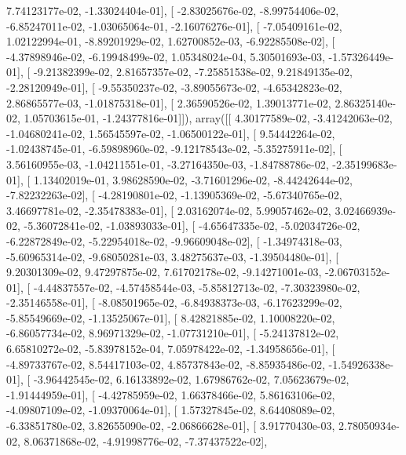 \documentclass{article}
\begin{document}
          7.74123177e-02,  -1.33024404e-01],
       [ -2.83025676e-02,  -8.99754406e-02,  -6.85247011e-02,
         -1.03065064e-01,  -2.16076276e-01],
       [ -7.05409161e-02,   1.02122994e-01,  -8.89201929e-02,
          1.62700852e-03,  -6.92285508e-02],
       [ -4.37898946e-02,  -6.19948499e-02,   1.05348024e-04,
          5.30501693e-03,  -1.57326449e-01],
       [ -9.21382399e-02,   2.81657357e-02,  -7.25851538e-02,
          9.21849135e-02,  -2.28120949e-01],
       [ -9.55350237e-02,  -3.89055673e-02,  -4.65342823e-02,
          2.86865577e-03,  -1.01875318e-01],
       [  2.36590526e-02,   1.39013771e-02,   2.86325140e-02,
          1.05703615e-01,  -1.24377816e-01]]), array([[  4.30177589e-02,  -3.41242063e-02,  -1.04680241e-02,
          1.56545597e-02,  -1.06500122e-01],
       [  9.54442264e-02,  -1.02438745e-01,  -6.59898960e-02,
         -9.12178543e-02,  -5.35275911e-02],
       [  3.56160955e-03,  -1.04211551e-01,  -3.27164350e-03,
         -1.84788786e-02,  -2.35199683e-01],
       [  1.13402019e-01,   3.98628590e-02,  -3.71601296e-02,
         -8.44242644e-02,  -7.82232263e-02],
       [ -4.28190801e-02,  -1.13905369e-02,  -5.67340765e-02,
          3.46697781e-02,  -2.35478383e-01],
       [  2.03162074e-02,   5.99057462e-02,   3.02466939e-02,
         -5.36072841e-02,  -1.03893033e-01],
       [ -4.65647335e-02,  -5.02034726e-02,  -6.22872849e-02,
         -5.22954018e-02,  -9.96609048e-02],
       [ -1.34974318e-03,  -5.60965314e-02,  -9.68050281e-03,
          3.48275637e-03,  -1.39504480e-01],
       [  9.20301309e-02,   9.47297875e-02,   7.61702178e-02,
         -9.14271001e-03,  -2.06703152e-01],
       [ -4.44837557e-02,  -4.57458544e-03,  -5.85812713e-02,
         -7.30323980e-02,  -2.35146558e-01],
       [ -8.08501965e-02,  -6.84938373e-03,  -6.17623299e-02,
         -5.85549669e-02,  -1.13525067e-01],
       [  8.42821885e-02,   1.10008220e-02,  -6.86057734e-02,
          8.96971329e-02,  -1.07731210e-01],
       [ -5.24137812e-02,   6.65810272e-02,  -5.83978152e-04,
          7.05978422e-02,  -1.34958656e-01],
       [ -4.89733767e-02,   8.54417103e-02,   4.85737843e-02,
         -8.85935486e-02,  -1.54926338e-01],
       [ -3.96442545e-02,   6.16133892e-02,   1.67986762e-02,
          7.05623679e-02,  -1.91444959e-01],
       [ -4.42785959e-02,   1.66378466e-02,   5.86163106e-02,
         -4.09807109e-02,  -1.09370064e-01],
       [  1.57327845e-02,   8.64408089e-02,  -6.33851780e-02,
          3.82655090e-02,  -2.06866628e-01],
       [  3.91770430e-03,   2.78050934e-02,   8.06371868e-02,
         -4.91998776e-02,  -7.37437522e-02],
\end{document}
